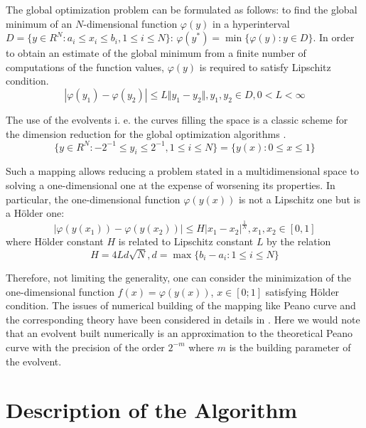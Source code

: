 \documentclass[procedia]{easychair}
\begin{document}
The global optimization problem can be formulated as follows:
to find the global minimum of an \(N\)-dimensional function \(\varphi(y)\) in a hyperinterval
\(D=\{y\in R^N:a_i\leqslant x_i\leqslant{b_i}, 1\leqslant{i}\leqslant{N}\}\): \(\varphi(y^*)=\min\{\varphi(y):y\in D\}\).
In order to obtain an estimate of the global minimum from a finite number of computations
of the function values, \(\varphi(y)\) is required to satisfy Lipschitz condition.
\begin{displaymath}
\label{lip}
|\varphi(y_1)-\varphi(y_2)|\leqslant L\Vert y_1-y_2\Vert,y_1,y_2\in D,0<L<\infty
\end{displaymath}
\par
The use of the evolvents i. e. the curves filling the space is a classic scheme
for the dimension reduction for the global optimization algorithms \cite{strOptBook}.
\begin{displaymath}
\label{cube}
\lbrace y\in R^N:-2^{-1}\leqslant y_i\leqslant 2^{-1},1\leqslant i\leqslant N\rbrace=\{y(x):0\leqslant x\leqslant 1\}
\end{displaymath}
\par
Such a mapping allows reducing a problem stated in a multidimensional space to solving
a one-dimensional one at the expense of worsening its properties. In particular,
the one-dimensional function \(\varphi(y(x))\) is not a Lipschitz one but is a Hölder one:
\begin{displaymath}
\label{holder}
|\varphi(y(x_1))-\varphi(y(x_2))|\leqslant H{|x_1-x_2|}^{\frac{1}{N}},x_1,x_2\in[0,1]
\end{displaymath}
where Hölder constant \(H\) is related to Lipschitz constant \(L\) by the relation
\begin{displaymath}
H=4Ld\sqrt{N},d=\max\{b_i-a_i:1\leqslant i\leqslant N\}
\end{displaymath}
\par
Therefore, not limiting the generality, one can consider the minimization of the
one-dimensional function \(f(x)=\varphi(y(x))\), \(x\in[0;1]\) satisfying Hölder condition.
The issues of numerical building of the mapping like Peano curve and the corresponding
theory have been considered in details in \cite{strOptBook}. Here we would note that an evolvent
built numerically is an approximation to the theoretical Peano curve with the precision
of the order \(2^{-m}\) where \(m\) is the building parameter of the evolvent.

\section{Description of the Algorithm}
\label{sect:algorithm}
\end{document}
